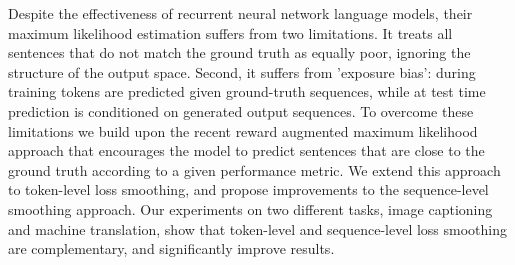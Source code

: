 Despite the effectiveness of recurrent neural network language models, their maximum likelihood estimation suffers from two limitations. It treats all sentences that do not match the ground truth as equally poor, ignoring the structure of the output space. Second, it suffers from 'exposure bias': during training tokens are predicted given ground-truth sequences, while at test time prediction is conditioned on generated output sequences. To overcome these limitations we build upon the recent reward augmented maximum likelihood  approach that encourages the model to predict sentences that are close to the ground truth according to a given performance metric. We extend this approach to token-level loss smoothing, and propose improvements to the sequence-level smoothing approach. Our experiments on two different tasks, image captioning and machine translation,  show that token-level and sequence-level loss smoothing are complementary, and significantly improve results.
